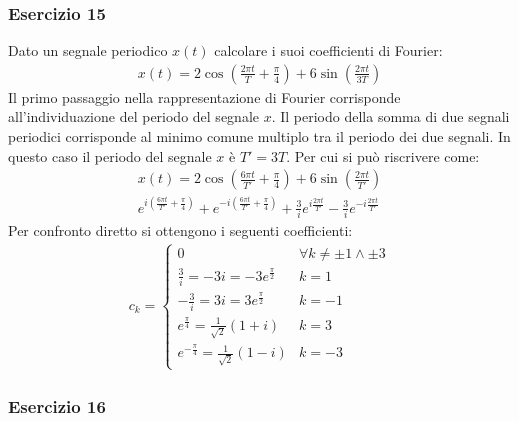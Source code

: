 \documentclass{article}
\begin{document}
\subsubsection*{Esercizio 15}

Dato un segnale periodico $x(t)$ calcolare i suoi coefficienti di Fourier:
\begin{gather*}
    x(t)=2\cos\displaystyle\left(\frac{2\pi t}{T}+\frac{\pi}{4}\right)+6\sin\left(\frac{2\pi t}{3T}\right)
\end{gather*}
Il primo passaggio nella rappresentazione di Fourier corrisponde all'individuazione del periodo del segnale $x$. Il periodo della somma di due segnali periodici corrisponde 
al minimo comune multiplo tra il periodo dei due segnali. In questo caso il periodo del segnale $x$ è $T'=3T$. Per cui si può riscrivere come:
\begin{gather*}
    x(t)=\displaystyle2\cos\left(\frac{6\pi t}{T'}+\frac{\pi}{4}\right)+6\sin\left(\frac{2\pi t}{T'}\right)\\
    \displaystyle e^{i\left(\frac{6\pi t}{T'}+\frac{\pi}{4}\right)}+e^{-i\left(\frac{6\pi t}{T'}+\frac{\pi}{4}\right)}+\frac{3}{i}e^{i\frac{2\pi t}{T'}}-\frac{3}{i}e^{-i\frac{2\pi t}{T'}}
\end{gather*} 
Per confronto diretto si ottengono i seguenti coefficienti:
\begin{gather}
    c_k=
    \begin{cases}
        0&\forall k\neq\pm1\land\pm3\\
        \displaystyle\frac{3}{i}=-3i=-3e^{\frac{\pi}{2}} &k=1\\
        -\displaystyle\frac{3}{i}=3i=3e^{\frac{\pi}{2}}&k=-1\\
        \displaystyle e^{\frac{\pi}{4}}=\frac{1}{\sqrt{2}}(1+i)&k=3\\
        \displaystyle e^{-\frac{\pi}{4}}=\frac{1}{\sqrt{2}}(1-i)&k=-3
    \end{cases}
\end{gather}

\subsubsection*{Esercizio 16}
\end{document}
